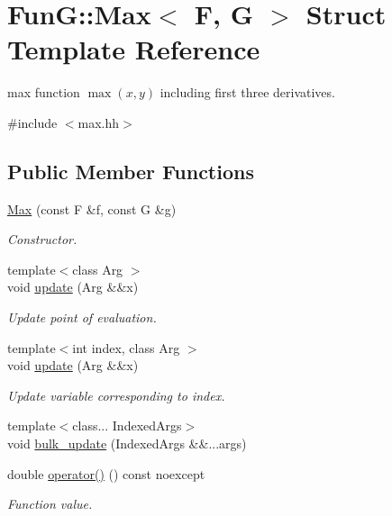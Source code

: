 \hypertarget{structFunG_1_1Max}{}\section{FunG\+:\+:Max$<$ F, G $>$ Struct Template Reference}
\label{structFunG_1_1Max}


max function $ \max(x,y) $ including first three derivatives.  




{\ttfamily \#include $<$max.\+hh$>$}

\subsection*{Public Member Functions}
\begin{DoxyCompactItemize}
\item 
\hyperlink{structFunG_1_1Max_a36634d1a8326fac047a1c7147e446f37}{Max} (const F \&f, const G \&g)
\begin{DoxyCompactList}\small\item\em Constructor. \end{DoxyCompactList}\item 
{\footnotesize template$<$class Arg $>$ }\\void \hyperlink{structFunG_1_1Max_a4544a007e03f04ec7bc6aef1f41bb09d}{update} (Arg \&\&x)
\begin{DoxyCompactList}\small\item\em Update point of evaluation. \end{DoxyCompactList}\item 
{\footnotesize template$<$int index, class Arg $>$ }\\void \hyperlink{structFunG_1_1Max_a6f3c89a9e33d2a9572a3e3a03c6b35af}{update} (Arg \&\&x)
\begin{DoxyCompactList}\small\item\em Update variable corresponding to index. \end{DoxyCompactList}\item 
{\footnotesize template$<$class... Indexed\+Args$>$ }\\void \hyperlink{structFunG_1_1Max_ad60a1d36ebea2729dace0b59830b99cb}{bulk\+\_\+update} (Indexed\+Args \&\&...args)
\item 
double \hyperlink{structFunG_1_1Max_a61b78618f4af19680467ef7eef58f96b}{operator()} () const noexcept
\begin{DoxyCompactList}\small\item\em Function value. \end{DoxyCompactList}\item 

\end{DoxyCompactItemize}
